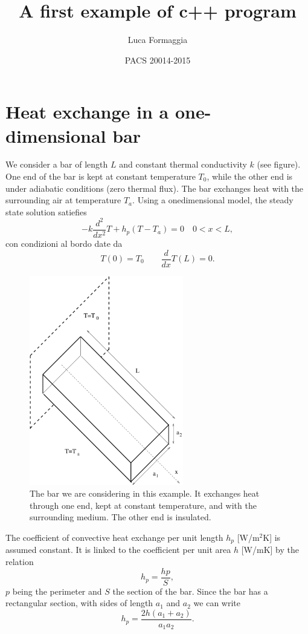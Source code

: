 \documentclass{article}
\author{Luca Formaggia}
\date{{PACS 20014-2015}\\
}
\title{A first example of c++ program}
\begin{document}
\section{Heat exchange in a one-dimensional bar}


We consider a bar of length $L$ and constant thermal conductivity $k$ (see figure).
One end of the bar is kept at constant temperature $T_0$, while the other end is under
adiabatic conditions (zero thermal flux).
The bar exchanges heat with the surrounding air at temperature $T_a$.  
Using a onedimensional model, the steady state solution 
satiefies
\begin{equation}
\label{eq:sto}
-k \frac{d^2}{dx^2}T + h_p(T-T_a)=0\quad 0<x<L,
\end{equation}
con condizioni al bordo date da
\begin{equation}
\label{eq:stobc}
T(0)=T_0\qquad \frac{d}{dx}T(L)=0.
\end{equation}

\begin{figure}
\includegraphics[width=0.6\textwidth]{Figure/barra}
\caption{The bar we are considering in this example. It exchanges heat
through one end, kept at constant temperature, and with the surrounding medium. The other end
is insulated.}
\end{figure}

The coefficient of convective heat exchange per unit length $h_p$
[W/m$^2$K] is assumed constant. It is linked to the coefficient per unit area 
$h$ [W/mK] by the relation
\[
h_p=\frac{hp}{S},
\]
$p$ being the perimeter and  $S$ the section of the bar. Since the bar has a rectangular section, 
with sides of length $a_1$ and $a_2$ we can write
\[
h_p=\frac{2h(a_1+a_2)}{a_1a_2}.
\]
\end{document}
